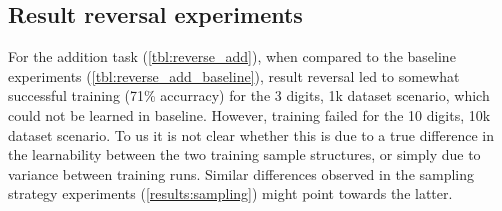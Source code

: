 \begin{table}[!htbp]
	\begin{minipage}[t]{0.47\linewidth}
		\hfill
		\label{tbl:sampling_strategies_sqrt_basic}
	\end{minipage}
	\hfill
	\begin{minipage}[t]{0.47\linewidth}
		\hfill
		\label{tbl:sampling_strategies_sqrt_fromzero}
	\end{minipage}
	
	\vspace{0.5cm}
	\begin{minipage}[t]{0.47\linewidth}
		\hfill
		\label{tbl:sampling_strategies_sqrt_uniformdigits}
	\end{minipage}
	\hfill
	\begin{minipage}[t]{0.47\linewidth}
		\hfill
		\label{tbl:sampling_strategies_sqrt_uniformbits}
	\end{minipage}
\end{table}


\FloatBarrier
\subsection{Result reversal experiments}
\label{results:reversal}


For the addition task (\cref{tbl:reverse_add}), when compared to the baseline experiments (\cref{tbl:reverse_add_baseline}), result reversal led to somewhat successful training (71\% accurracy) for the 3 digits, 1k dataset scenario, which could not be learned in baseline. However, training failed for the 10 digits, 10k dataset scenario.
To us it is not clear whether this is due to a true difference in the learnability between the two training sample structures, or simply due to variance between training runs. Similar differences observed in the sampling strategy experiments (\cref{results:sampling}) might point towards the latter.

